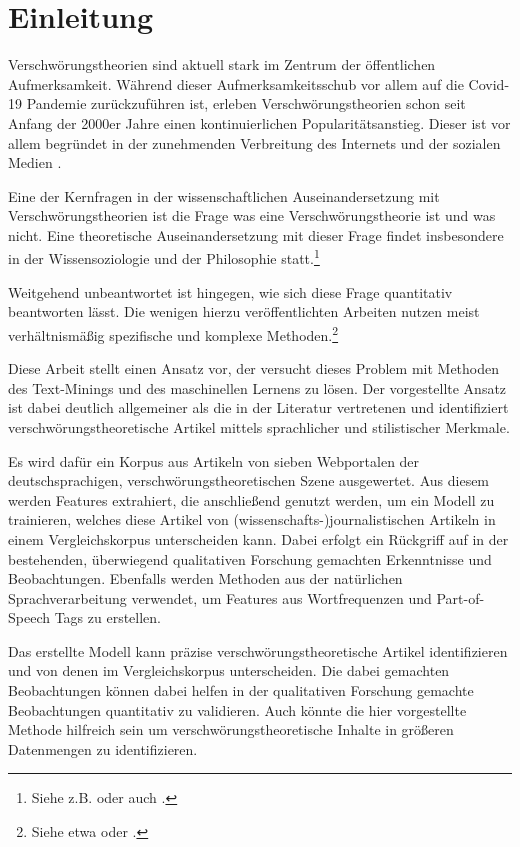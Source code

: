 \section{Einleitung}

Verschwörungstheorien sind aktuell stark im Zentrum der öffentlichen Aufmerksamkeit.
Während dieser Aufmerksamkeitsschub vor allem auf die Covid-19 Pandemie zurückzuführen ist, erleben Verschwörungstheorien schon seit Anfang der 2000er Jahre einen kontinuierlichen Popularitätsanstieg.
Dieser ist vor allem begründet in der zunehmenden Verbreitung des Internets und der sozialen Medien \parencite[vgl.][492]{stano_2020}.

Eine der Kernfragen in der wissenschaftlichen Auseinandersetzung mit Verschwörungstheorien ist die Frage was eine Verschwörungstheorie ist und was nicht.
Eine theoretische Auseinandersetzung mit dieser Frage findet insbesondere in der Wissensoziologie und der Philosophie statt.\footnote{Siehe z.B. \textcite[]{coady_2006} oder auch \textcite[23-53]{uscinski_2014}.}

Weitgehend unbeantwortet ist hingegen, wie sich diese Frage quantitativ beantworten lässt.
Die wenigen hierzu veröffentlichten Arbeiten nutzen meist verhältnismäßig spezifische und komplexe Methoden.\footnote{Siehe etwa \textcite[]{samory_2018} oder \textcite[]{shahsavari_2020}.}

Diese Arbeit stellt einen Ansatz vor, der versucht dieses Problem mit Methoden des Text-Minings und des maschinellen Lernens zu lösen.
Der vorgestellte Ansatz ist dabei deutlich allgemeiner als die in der Literatur vertretenen und identifiziert verschwörungstheoretische Artikel mittels sprachlicher und stilistischer Merkmale.

Es wird dafür ein Korpus aus Artikeln von sieben Webportalen der deutschsprachigen, verschwörungstheoretischen Szene ausgewertet. 
Aus diesem werden Features extrahiert, die anschließend genutzt werden, um ein Modell zu trainieren, welches diese Artikel von (wissenschafts-)journalistischen Artikeln in einem Vergleichskorpus unterscheiden kann.
Dabei erfolgt ein Rückgriff auf in der bestehenden, überwiegend qualitativen Forschung gemachten Erkenntnisse und Beobachtungen.
Ebenfalls werden Methoden aus der natürlichen Sprachverarbeitung verwendet, um Features aus Wortfrequenzen und Part-of-Speech Tags zu erstellen.

Das erstellte Modell kann präzise verschwörungstheoretische Artikel identifizieren und von denen im Vergleichskorpus unterscheiden.
Die dabei gemachten Beobachtungen können dabei helfen in der qualitativen Forschung gemachte Beobachtungen quantitativ zu validieren.
Auch könnte die hier vorgestellte Methode hilfreich sein um verschwörungstheoretische Inhalte in größeren Datenmengen zu identifizieren.